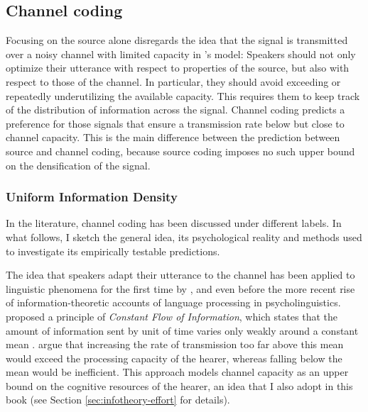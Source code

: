\subsection{Channel coding}
\label{sec:infotheory-uid}
Focusing on the source alone disregards the idea that the signal is transmitted over a noisy channel with limited capacity in \citeauthor{shannon1948}'s model: Speakers should not only optimize their utterance with respect to properties of the source, but also with respect to those of the channel. In particular, they should avoid exceeding or repeatedly underutilizing the available capacity. This requires them to keep track of the distribution of information across the signal. Channel coding predicts a preference for those signals that ensure a transmission rate below but close to channel capacity. This is the main difference between the prediction between source and channel coding, because source coding imposes no such upper bound on the densification of the signal.

\subsubsection{Uniform Information Density}
In the literature, channel coding has been discussed under different labels. In what follows, I sketch the general idea, its psychological reality and methods used to investigate its empirically testable predictions.

The idea that speakers adapt their utterance to the channel has been applied to linguistic phenomena for the first time by \citet{fenk.fenk1980}, \citet{fenk-oczlon1989} and \citet{fenk-oczlon1990} even before the more recent rise of information-theoretic accounts of language processing in psycholinguistics. \citet{fenk.fenk1980} proposed a principle of \textit{Constant Flow of Information}, which states that the amount of information sent by unit of time varies only weakly around a constant mean \citep[38]{fenk-oczlon1990}. \citet[403]{fenk.fenk1980} argue that increasing the rate of transmission too far above this mean would exceed the processing capacity of the hearer, whereas falling below the mean would be inefficient. This approach models channel capacity as an upper bound on the cognitive resources of the hearer, an idea that I also adopt in this book (see Section \ref{sec:infotheory-effort} for details).

